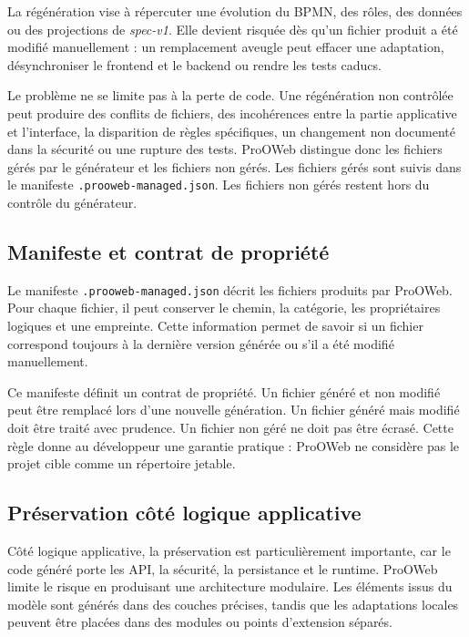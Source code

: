 La régénération vise à répercuter une évolution du BPMN, des rôles, des données
ou des projections de \textit{spec-v1}. Elle devient risquée dès qu'un fichier
produit a été modifié manuellement : un remplacement aveugle peut effacer une
adaptation, désynchroniser le frontend et le backend ou rendre les tests caducs.

Le problème ne se limite pas à la perte de code. Une régénération non contrôlée peut produire des conflits de fichiers, des incohérences entre la partie applicative et l'interface, la disparition de règles spécifiques, un changement non documenté dans la sécurité ou une rupture des tests. ProOWeb distingue donc les fichiers gérés par le générateur et les fichiers non gérés. Les fichiers gérés sont suivis dans le manifeste \texttt{.prooweb-managed.json}. Les fichiers non gérés restent hors du contrôle du générateur.

\subsection{Manifeste et contrat de propriété}

Le manifeste \texttt{.prooweb-managed.json} décrit les fichiers produits par ProOWeb. Pour chaque fichier, il peut conserver le chemin, la catégorie, les propriétaires logiques et une empreinte. Cette information permet de savoir si un fichier correspond toujours à la dernière version générée ou s'il a été modifié manuellement.

Ce manifeste définit un contrat de propriété. Un fichier généré et non modifié peut être remplacé lors d'une nouvelle génération. Un fichier généré mais modifié doit être traité avec prudence. Un fichier non géré ne doit pas être écrasé. Cette règle donne au développeur une garantie pratique : ProOWeb ne considère pas le projet cible comme un répertoire jetable.

\subsection{Préservation côté logique applicative}

Côté logique applicative, la préservation est particulièrement importante, car le code généré porte les API, la sécurité, la persistance et le runtime. ProOWeb limite le risque en produisant une architecture modulaire. Les éléments issus du modèle sont générés dans des couches précises, tandis que les adaptations locales peuvent être placées dans des modules ou points d'extension séparés.

